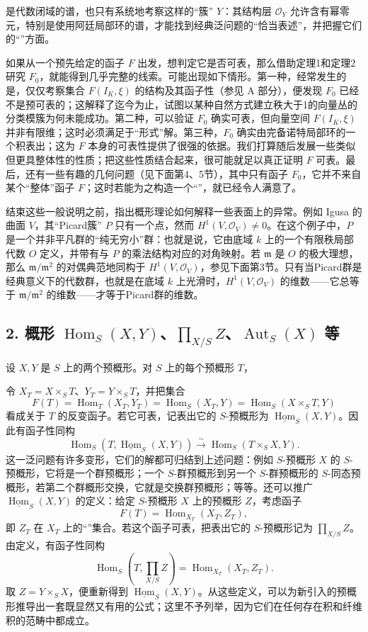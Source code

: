 是代数闭域的谱，也只有系统地考察这样的“簇” $Y$：其结构层 $\mathcal O_Y$ 允许含有幂零元，特别是使用阿廷局部环的谱，才能找到经典泛问题的“恰当表述”，并把握它们的“”方面。

如果从一个预先给定的函子 $F$ 出发，想判定它是否可表，那么借助定理1和定理2研究 $F_0$，就能得到几乎完整的线索。可能出现如下情形。第一种，经常发生的是，仅仅考察集合 $F(I_K,\xi)$ 的结构及其函子性（参见 A 部分），便发现 $F_0$ 已经不是预可表的；这解释了迄今为止，试图以某种自然方式建立秩大于1的向量丛的分类模簇为何未能成功。第二种，可以验证 $F_0$ 确实可表，但向量空间 $F(I_K,\xi)$ 并非有限维；这时必须满足于“形式”解。第三种，$F_0$ 确实由完备诺特局部环的一个积表出；这为 $F$ 本身的可表性提供了很强的依据。我们打算随后发展一些类似但更具整体性的性质；把这些性质结合起来，很可能就足以真正证明 $F$ 可表。最后，还有一些有趣的几何问题（见下面第4、5节），其中只有函子 $F_0$，它并不来自某个“整体”函子 $F$；这时若能为之构造一个“”，就已经令人满意了。

结束这些一般说明之前，指出概形理论如何解释一些表面上的异常。例如 Igusa 的曲面 $V$，其“Picard簇” $P$ 只有一个点，然而 $H^1(V,\mathcal O_V)\ne0$。在这个例子中，$P$ 是一个并非平凡群的“纯无穷小”群：也就是说，它由底域 $k$ 上的一个有限秩局部代数 $O$ 定义，并带有与 $P$ 的乘法结构对应的对角映射。若 $\mathfrak m$ 是 $O$ 的极大理想，那么 $\mathfrak m/\mathfrak m^2$ 的对偶典范地同构于 $H^1(V,\mathcal O_V)$，参见下面第3节。只有当Picard群是经典意义下的代数群，也就是在底域 $k$ 上光滑时，$H^1(V,\mathcal O_V)$ 的维数——它总等于 $\mathfrak m/\mathfrak m^2$ 的维数——才等于Picard群的维数。
\subsection*{2. 概形 $\operatorname{Hom}_S(X,Y)$、$\prod_{X/S}Z$、$\operatorname{Aut}_S(X)$ 等}
设 $X,Y$ 是 $S$ 上的两个预概形。对 $S$ 上的每个预概形 $T$，

令 $X_T=X\times_S T$、$Y_T=Y\times_S T$，并把集合
\[
 F(T)=\operatorname{Hom}_T(X_T,Y_T)
 =\operatorname{Hom}_S(X_T,Y)
 =\operatorname{Hom}_S(X\times_S T,Y)
\]
看成关于 $T$ 的反变函子。若它可表，记表出它的 $S$-预概形为 $\underline{\operatorname{Hom}}_S(X,Y)$。因此有函子性同构
\[
 \operatorname{Hom}_S\!\left(T,\underline{\operatorname{Hom}}_S(X,Y)\right)
 \xrightarrow{\sim}\operatorname{Hom}_S(T\times_S X,Y).
\]
这一泛问题有许多变形，它们的解都可归结到上述问题：例如 $S$-预概形 $X$ 的 $S$-预概形，它将是一个群预概形；一个 $S$-群预概形到另一个 $S$-群预概形的 $S$-同态预概形，若第二个群概形交换，它就是交换群预概形；等等。还可以推广 $\underline{\operatorname{Hom}}_S(X,Y)$ 的定义：给定 $S$-预概形 $X$ 上的预概形 $Z$，考虑函子
\[
 F(T)=\operatorname{Hom}_{X_T}(X_T,Z_T),
\]
即 $Z_T$ 在 $X_T$ 上的“”集合。若这个函子可表，把表出它的 $S$-预概形记为 $\prod_{X/S}Z$。由定义，有函子性同构
\[
 \operatorname{Hom}_S\!\left(T,\prod_{X/S}Z\right)
 =\operatorname{Hom}_{X_T}(X_T,Z_T).
\]
取 $Z=Y\times_S X$，便重新得到 $\underline{\operatorname{Hom}}_S(X,Y)$。从这些定义，可以为新引入的预概形推导出一套既显然又有用的公式；这里不予列举，因为它们在任何存在积和纤维积的范畴中都成立。

